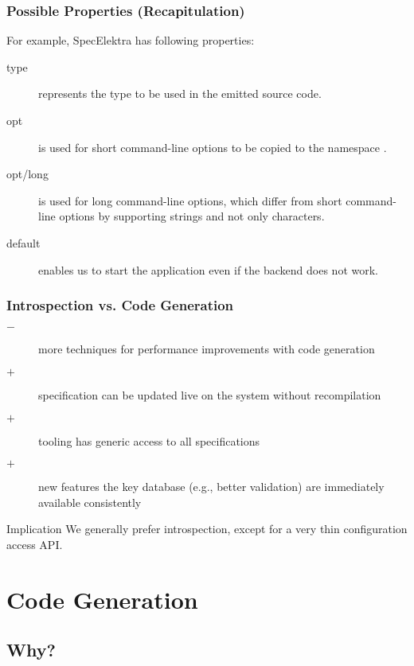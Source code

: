 \begin{frame}
	\frametitle{Possible Properties (Recapitulation)}

	For example, SpecElektra has following properties:
	\begin{description}
	\item[type] represents the type to be used in the emitted source code.
	\item[opt] is used for short command-line options to be copied to the namespace .
	\item[opt/long] is used for long command-line options, which differ from short command-line options by supporting strings and not only characters.
	\item[default] enables us to start the application even if the backend does not work.
	\end{description}
\end{frame}

\begin{frame}
	\frametitle{Introspection vs. Code Generation}

	\begin{description}
	\item[$-$] more techniques for performance improvements with code generation
	\item[$+$] specification can be updated live on the system without recompilation
	\item[$+$] tooling has generic access to all specifications
 	\item[$+$] new features the key database (e.g., better validation) are immediately available consistently
	\end{description}

	\vspace{0.5em}

	\begin{alertblock}{Implication}
	We generally prefer introspection, except for a very thin configuration access API.
	\end{alertblock}
\end{frame}



\section{Code Generation}

\subsection{Why?}

